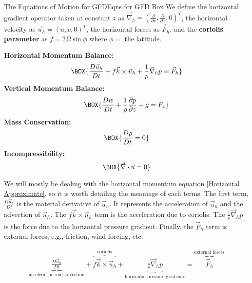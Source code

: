 \begin{fact}{The Equations of Motion for GFD}{Eqns for GFD Box}\label{Eqns for GFD Box}
    We define the horizontal gradient operator taken at constant $z$ as $\vec{\nabla}_h=\left( \frac{\partial}{\partial x},\frac{\partial}{\partial x},0 \right)^T$, the horizontal velocity as $\vec{u}_h=\left( u,v,0 \right)^T$, the horizontal forces as $\vec{F}_h$, and the \textbf{coriolis parameter} as $f=2\Omega\sin\phi$ where $\phi=$ the latitude.
    \begin{multicols}{2}
        \textbf{Horizontal Momentum Balance:}
        \begin{gather}
            \label{Horizontal Approximate}
            \BOX{\frac{D\vec{u}_h}{Dt}+f\vec{k}\times\vec{u}_h+\frac{1}{\rho}\vec{\nabla}_hp=\vec{F}_h}
        \end{gather}
        \textbf{Vertical Momentum Balance:}
        \begin{gather}
            \label{Vertical Approximate}
            \BOX{\frac{Dw}{Dt}+\frac{1}{\rho}\frac{\partial p }{\partial z}+g=F_z}
        \end{gather}
        \textbf{Mass Conservation:}
        \begin{gather}
            \label{Mass Material Conservation}
            \BOX{\frac{D\rho}{Dt}=0}
        \end{gather}
        \textbf{Incompressibility:}
        \begin{gather}
            \label{Incompressibility}
        \BOX{\vec{\nabla}\cdot\vec{u}=0}
        \end{gather}
    \end{multicols}
\end{fact}

We will mostly be dealing with the horizontal momentum equation \ref{Horizontal Approximate}, so it is worth detailing the meanings of each terms. The first term, $\frac{D\vec{u}_h}{Dt}$ is the material derivative of $\vec{u}_h$. It represents the acceleration of $\vec{u}_h$ and the advection of $\vec{u}_h$. The $f\vec{k}\times\vec{u}_h$ term is the acceleration due to coriolis. The $\frac{1}{\rho}\vec{\nabla}_h p$ is the force due to the horizontal pressure gradient. Finally, the $\vec{F}_h$ term is external forces, e.g., friction, wind-forcing, etc.

\begin{align*}
    \underbrace{\frac{D\vec{u}_h}{Dt}}_\text{acceleration and advection}+
    \overbrace{f\vec{k}\times\vec{u}_h}^\text{coriolis}+
    \underbrace{\frac{1}{\rho}\vec{\nabla}_hp}_\text{horizontal pressure gradients}=\overbrace{\vec{F}_h}^\text{external forces}
\end{align*}

